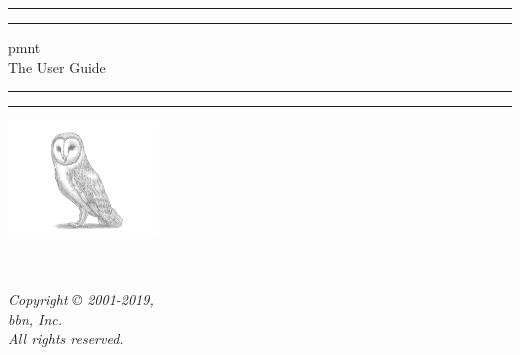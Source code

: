 
\begin{titlepage}
	\centering

	\vspace*{\baselineskip}

	\rule{\textwidth}{1.6pt}\vspace*{-\baselineskip}\vspace*{2pt}
	\rule{\textwidth}{0.4pt}

	\vspace{0.75\baselineskip}

	{\LARGE\acl{pmnt}\\ The User Guide\\}

	\vspace{0.75\baselineskip}

	\rule{\textwidth}{0.4pt}\vspace*{-\baselineskip}\vspace{3.2pt}
	\rule{\textwidth}{1.6pt}

	\vspace{2\baselineskip}

	\includegraphics[width=0.3\textwidth]{BarnOwl.jpeg}

	\vspace*{4\baselineskip}

	{\Large\theauthor\\}

	\vspace{0.5\baselineskip}

	\textit{\thedate}

	\vfill

	\textit{Copyright © 2001-2019,\\
	\acl{bbn}, Inc.\\
	All rights reserved.}
\end{titlepage}
\tableofcontents
\listoffigures
\listoftables
